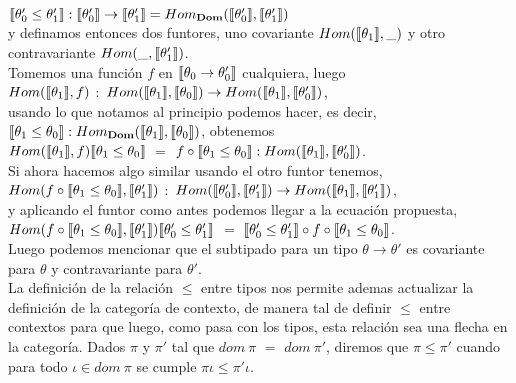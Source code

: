 $\llbracket \theta_0' \leq \theta_1' \rrbracket : \llbracket \theta_0' \rrbracket \rightarrow \llbracket \theta_1' \rrbracket
= Hom_{\textbf{Dom}}(\llbracket \theta_0' \rrbracket,\llbracket \theta_1' \rrbracket)$\\

y definamos entonces dos funtores, uno covariante $Hom(\llbracket \theta_1 \rrbracket, \_ )$ y otro contravariante
$Hom(\_,\llbracket \theta_1' \rrbracket)$. \\

Tomemos una funci\'on $f$ en $\llbracket \theta_0 \rightarrow \theta_0' \rrbracket$ cualquiera, luego \\

$Hom(\llbracket \theta_1 \rrbracket, f)$ $:$ 
$Hom(\llbracket \theta_1 \rrbracket, \llbracket \theta_0 \rrbracket) \rightarrow Hom(\llbracket \theta_1 \rrbracket, \llbracket \theta_0' \rrbracket)$,\\

usando lo que notamos al principio podemos hacer, es decir, $\llbracket \theta_1 \leq \theta_0 \rrbracket : Hom_{\textbf{Dom}}(\llbracket \theta_1 \rrbracket,\llbracket \theta_0 \rrbracket)$, obtenemos \\

$Hom(\llbracket \theta_1 \rrbracket, f) \llbracket \theta_1 \leq \theta_0 \rrbracket$ $=$ $f \circ \llbracket \theta_1 \leq \theta_0 \rrbracket : 
Hom(\llbracket \theta_1 \rrbracket, \llbracket \theta_0' \rrbracket)$.\\

Si ahora hacemos algo similar usando el otro funtor tenemos,\\

$Hom(f \circ \llbracket \theta_1 \leq \theta_0 \rrbracket, \llbracket \theta_1' \rrbracket)$ $:$ 
$Hom(\llbracket \theta_0' \rrbracket, \llbracket \theta_1' \rrbracket) \rightarrow Hom(\llbracket \theta_1 \rrbracket, \llbracket \theta_1' \rrbracket)$,\\

y aplicando el funtor como antes podemos llegar a la ecuación propuesta,\\

$Hom(f \circ \llbracket \theta_1 \leq \theta_0 \rrbracket, \llbracket \theta_1' \rrbracket)\llbracket \theta_0' \leq \theta_1' \rrbracket$ $=$
$\llbracket \theta_0' \leq \theta_1' \rrbracket \circ f \circ \llbracket \theta_1 \leq \theta_0 \rrbracket$.\\

Luego podemos mencionar que el subtipado para un tipo $\theta \rightarrow \theta'$ es covariante
para $\theta$ y contravariante para $\theta'$.\\

La definici\'on de la relaci\'on $\leq$ entre tipos nos permite ademas actualizar 
la definici\'on de la categor\'ia de contexto, de manera tal de definir $\leq$ entre
contextos para que luego, como pasa con los tipos, esta relaci\'on sea una flecha 
en la categor\'ia. Dados $\pi$ y $\pi'$ tal que $dom \ \pi$ $=$ $dom \ \pi'$, diremos
que $\pi \leq \pi'$ cuando para todo $\iota \in dom \ \pi$ se cumple $\pi \iota \leq \pi' \iota$.

